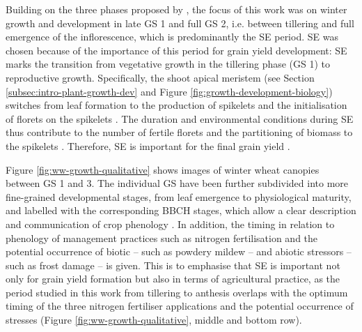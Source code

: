 Building on the three phases proposed by \cite{kirby_analysis_1988}, the focus of this work was on winter growth and development in late \gls{GS} 1 and full \gls{GS} 2, i.e. between tillering and full emergence of the inflorescence, which is predominantly the \gls{SE} period. \gls{SE} was chosen because of the importance of this period for grain yield development: \gls{SE} marks the transition from vegetative growth in the tillering phase (\gls{GS} 1) to reproductive growth. Specifically, the shoot apical meristem (see Section \ref{subsec:intro-plant-growth-dev} and Figure \ref{fig:growth-development-biology}) switches from leaf formation to the production of spikelets and the initialisation of florets on the spikelets \citep{mcmaster_simulating_1992}. The duration and environmental conditions during \gls{SE} thus contribute to the number of fertile florets and the partitioning of biomass to the spikelets \citep{gonzalez_grain_2003}. Therefore, \gls{SE} is important for the final grain yield \citep{fischer_yield_1975,fischer_wheat_2011}.

Figure \ref{fig:ww-growth-qualitative} shows images of winter wheat canopies between \gls{GS} 1 and 3. The individual \gls{GS} have been further subdivided into more fine-grained developmental stages, from leaf emergence to physiological maturity, and labelled with the corresponding \gls{BBCH} stages, which allow a clear description and communication of crop phenology \citep{lancashire_uniform_1991}. In addition, the timing in relation to phenology of management practices such as nitrogen fertilisation and the potential occurrence of biotic -- such as powdery mildew -- and abiotic stressors -- such as frost damage -- is given. This is to emphasise that \gls{SE} is important not only for grain yield formation but also in terms of agricultural practice, as the period studied in this work from tillering to anthesis overlaps with the optimum timing of the three nitrogen fertiliser applications \citep{lewis_effect_1938} and the potential occurrence of stresses (Figure \ref{fig:ww-growth-qualitative}, middle and bottom row).

